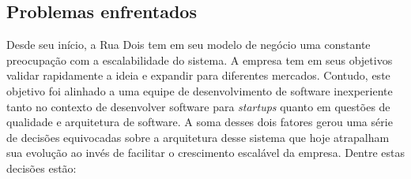 \subsection{Problemas enfrentados}

Desde seu início, a Rua Dois tem em seu modelo de negócio uma constante
preocupação com a escalabilidade do sistema. A empresa tem em seus objetivos
validar rapidamente a ideia e expandir para diferentes mercados. Contudo,
este objetivo foi alinhado a uma equipe de desenvolvimento de software
inexperiente tanto no contexto de desenvolver software para \textit{startups}
quanto em questões de qualidade e arquitetura de software. A soma desses
dois fatores gerou uma série de decisões equivocadas sobre a arquitetura
desse sistema que hoje atrapalham sua evolução ao invés de facilitar o
crescimento escalável da empresa. Dentre estas decisões estão:

